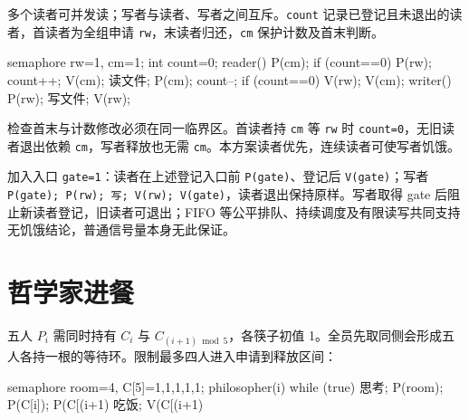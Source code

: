 多个读者可并发读；写者与读者、写者之间互斥。\texttt{count} 记录已登记且未退出的读者，首读者为全组申请 \texttt{rw}，末读者归还，\texttt{cm} 保护计数及首末判断。

\par\smallskip\noindent\begin{minipage}{\linewidth}
\begin{codeblock}[language={}]
semaphore rw=1, cm=1;
int count=0;
reader() {
    P(cm);
    if (count==0) P(rw);
    count++;
    V(cm);
    读文件;
    P(cm);
    count--;
    if (count==0) V(rw);
    V(cm);
}
writer() { P(rw); 写文件; V(rw); }
\end{codeblock}
\end{minipage}\par\smallskip

检查首末与计数修改必须在同一临界区。首读者持 \texttt{cm} 等 \texttt{rw} 时 \texttt{count=\allowbreak{}0}，无旧读者退出依赖 \texttt{cm}，写者释放也无需 \texttt{cm}。本方案读者优先，连续读者可使写者饥饿。

加入入口 \texttt{gate=\allowbreak{}1}：读者在上述登记入口前 \texttt{P(\allowbreak{}gate)\allowbreak{}}、登记后 \texttt{V(\allowbreak{}gate)\allowbreak{}}；写者 \texttt{P(\allowbreak{}gate)\allowbreak{};\allowbreak{} P(\allowbreak{}rw)\allowbreak{};\allowbreak{} 写;\allowbreak{} V(\allowbreak{}rw)\allowbreak{};\allowbreak{} V(\allowbreak{}gate)\allowbreak{}}，读者退出保持原样。写者取得 gate 后阻止新读者登记，旧读者可退出；FIFO 等公平排队、持续调度及有限读写共同支持无饥饿结论，普通信号量本身无此保证。

\section{哲学家进餐}\label{OS02-philosophers}

五人 \(P_i\) 需同时持有 \(C_i\) 与 \(C_{(i+1)\bmod5}\)，各筷子初值 1。全员先取同侧会形成五人各持一根的等待环。限制最多四人进入申请到释放区间：

\par\smallskip\noindent\begin{minipage}{\linewidth}
\begin{codeblock}[language={}]
semaphore room=4, C[5]={1,1,1,1,1};
philosopher(i) {
    while (true) {
        思考;
        P(room); P(C[i]); P(C[(i+1)%
        吃饭;
        V(C[(i+1)%
    }
}
\end{codeblock}
\end{minipage}\par\smallskip

